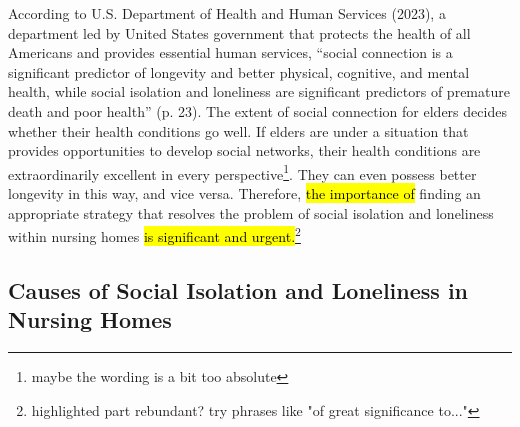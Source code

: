 \documentclass[12pt]{article}
\begin{document}
According to U.S. Department of Health and Human Services (2023), a department led by United States government that protects the health of all Americans and provides essential human services, “social connection is a significant predictor of longevity and better physical, cognitive, and mental health, while social isolation and loneliness are significant predictors of premature death and poor health” (p. 23).  The extent of social connection for elders decides whether their health conditions go well. If elders are under a situation that provides opportunities to develop social networks, their health conditions are extraordinarily excellent in every perspective\footnote{maybe the wording is a bit too absolute}. They can even possess better longevity in this way, and vice versa. Therefore, \hl{the importance of} finding an appropriate strategy that resolves the problem of social isolation and loneliness within nursing homes \hl{is significant and urgent.}\footnote{highlighted part rebundant? try phrases like "of great significance to..."}


\subsection{Causes of Social Isolation and Loneliness in Nursing Homes}
\end{document}
